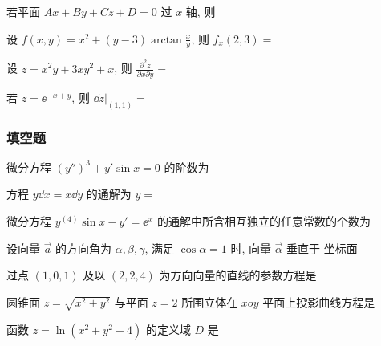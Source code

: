 \begin{ti}
	若平面 $Ax + By + Cz + D = 0$ 过 $x$ 轴, 则 \kuo
\end{ti}

\begin{ti}
	设 $f(x,y) = x^{2} + (y - 3) \arctan \frac{x}{y}$, 则 $f_{x}(2,3) = $ \kuo
\end{ti}

\begin{ti}
	设 $z = x^{2}y + 3xy^{2} + x$, 则 $\frac{\partial^{2}z}{\partial x \partial y} = $ \kuo
\end{ti}

\begin{ti}
	若 $z = \ee^{-x + y}$, 则 $\dd{z}\bigr|_{(1,1)} = $ \kuo
\end{ti}

\subsubsection{填空题}
\begin{ti}
	微分方程 $(y'')^{3} + y' \sin x = 0$ 的阶数为 \hua
\end{ti}

\begin{ti}
	方程 $y \dd{x} = x \dd{y}$ 的通解为 $y = $ \hua
\end{ti}

\begin{ti}
	微分方程 $y^{(4)} \sin x - y' = \ee^{x}$ 的通解中所含相互独立的任意常数的个数为 \hua
\end{ti}

\begin{ti}
	设向量 $\vec{a}$ 的方向角为 $\alpha,\beta,\gamma$, 满足 $\cos \alpha = 1$ 时, 向量 $\vec{\alpha}$ 垂直于 \hua{} 坐标面
\end{ti}

\begin{ti}
	过点 $(1,0,1)$ 及以 $(2,2,4)$ 为方向向量的直线的参数方程是 \hua
\end{ti}

\begin{ti}
	圆锥面 $z = \sqrt{x^{2} + y^{2}}$ 与平面 $z = 2$ 所围立体在 $xoy$ 平面上投影曲线方程是 \hua
\end{ti}

\begin{ti}
	函数 $z = \ln(x^{2} + y^{2} - 4)$ 的定义域 $D$ 是 \hua
\end{ti}

